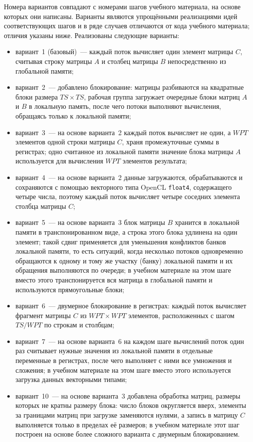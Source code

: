 \documentclass[a4paper]{article}
\begin{document}
Номера вариантов совпадают с номерами шагов учебного материала,
на основе которых они написаны. Варианты являются упрощёнными
реализациями идей соответствующих шагов и в ряде случаев отличаются
от кода учебного материала; отличия указаны ниже. Реализованы следующие
варианты:
\begin{itemize}
    \item вариант~1 (базовый)~--- каждый поток вычисляет один элемент
    матрицы $C$, считывая строку матрицы $A$ и столбец матрицы $B$
    непосредственно из глобальной памяти;
    \item вариант~2~--- добавлено блокирование: матрицы разбиваются на
    квадратные блоки размера $TS \times TS$, рабочая группа загружает
    очередные блоки матриц $A$ и $B$ в локальную память, после чего
    потоки выполняют вычисления, обращаясь только к локальной памяти;
    \item вариант~3~--- на основе варианта~2 каждый поток вычисляет
    не один, а $WPT$ элементов одной строки матрицы $C$, храня
    промежуточные суммы в регистрах; одно считанное из локальной памяти
    значение блока матрицы $A$ используется для вычисления $WPT$
    элементов результата;
    \item вариант~4~--- на основе варианта~2 данные загружаются,
    обрабатываются и сохраняются с помощью векторного типа OpenCL
    \texttt{float4}, содержащего четыре числа, поэтому каждый поток
    вычисляет четыре соседних элемента столбца матрицы $C$;
    \item вариант~5~--- на основе варианта~3 блок матрицы $B$ хранится
    в локальной памяти в транспонированном виде, а строка этого блока
    удлинена на один элемент; такой сдвиг применяется для уменьшения
    конфликтов банков локальной памяти, то есть ситуаций, когда
    несколько потоков одновременно обращаются к одному и тому же
    участку (банку) локальной памяти и их обращения выполняются по
    очереди; в учебном материале на этом шаге вместо этого
    транспонируется вся матрица в глобальной памяти и используются
    прямоугольные блоки;
    \item вариант~6~--- двумерное блокирование в регистрах: каждый поток
    вычисляет фрагмент матрицы $C$ из $WPT \times WPT$ элементов,
    расположенных с шагом $TS/WPT$ по строкам и столбцам;
    \item вариант~7~--- на основе варианта~6 на каждом шаге вычислений
    поток один раз считывает нужные значения из локальной памяти в
    отдельные переменные в регистрах, после чего выполняет с ними все
    умножения и сложения; в учебном материале на этом шаге вместо этого
    используется загрузка данных векторными типами;
    \item вариант~10~--- на основе варианта~3 добавлена обработка
    матриц, размеры которых не кратны размеру блока: число блоков
    округляется вверх, элементы за границами матриц при загрузке
    заменяются нулями, а запись в матрицу $C$ выполняется только в
    пределах её размеров; в учебном материале этот шаг построен на
    основе более сложного варианта с двумерным блокированием.
\end{itemize}
\end{document}
